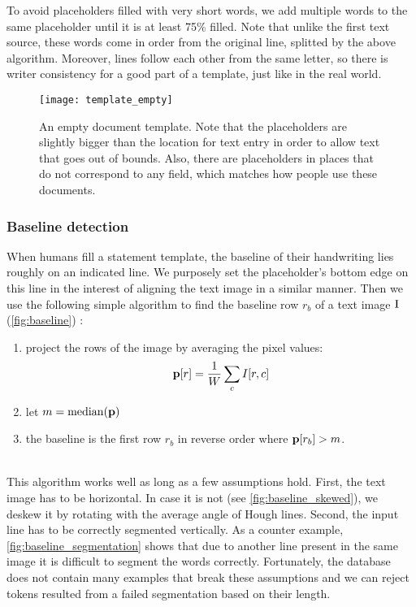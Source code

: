 		To avoid placeholders filled with very short words, we add multiple words to the same placeholder until it is at least 75\% filled. Note that unlike the first text source, these words come in order from the original line, splitted by the above algorithm. Moreover, lines follow each other from the same letter, so there is writer consistency for a good part of a template, just like in the real world.

		\begin{figure}
			\centering
			\texttt{[image: template\_empty]}
			\caption[Document template]{An empty document template. Note that the placeholders are slightly bigger than the location for text entry in order to allow text that goes out of bounds. Also, there are placeholders in places that do not correspond to any field, which matches how people use these documents.}
			\label{fig:template}
		\end{figure}


		\subsubsection{Baseline detection}
			When humans fill a statement template, the baseline of their handwriting lies roughly on an indicated line.  We purposely set the placeholder's bottom edge on this line in the interest of aligning the text image in a similar manner. Then we use the following simple algorithm to find the baseline row \(r_b\) of a text image \(\mathrm{I}\) (\autoref{fig:baseline}) :
			\noindent\begin{minipage}{\linewidth}
			\begin{enumerate}
				\item project the rows of the image by averaging the pixel values: \[
					\mathbf{p}[r] = \frac{1}{W} \sum_c I[r,c]
				\]
				\item let \(m = \mathrm{median}(\mathbf{p})\)
				\item the baseline is the first row \(r_b\) in reverse order where \(\mathbf{p}[r_b] > m\).
			\end{enumerate}
			\end{minipage}\\

			This algorithm works well as long as a few assumptions hold. First, the text image has to be horizontal. In case it is not (see \autoref{fig:baseline_skewed}), we deskew it by rotating with the average angle of Hough lines. Second, the input line has to be correctly segmented vertically. As a counter example, \autoref{fig:baseline_segmentation} shows that due to another line present in the same image it is difficult to segment the words correctly. Fortunately, the database does not contain many examples that break these assumptions and we can reject tokens resulted from a failed segmentation based on their length.

